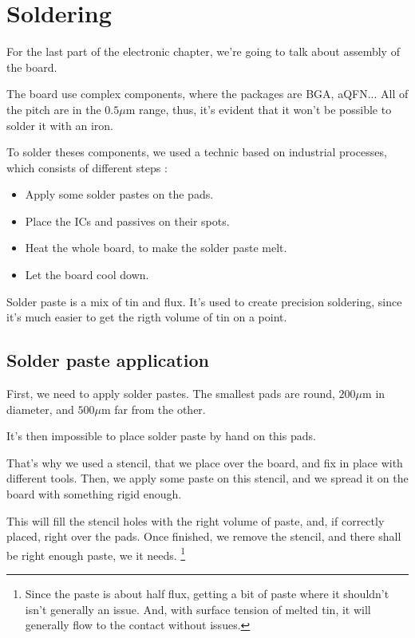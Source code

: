 \section{Soldering}
For the last part of the electronic chapter, we're going to talk about
assembly of the board.

The board use complex components, where the packages are BGA, aQFN...
All of the pitch are in the $0.5 \si{\mu\meter}$ range, thus, it's
evident that it won't be possible to solder it with an iron.

To solder theses components, we used a technic based on industrial
processes, which consists of different steps :

\begin{itemize}
    \item   Apply some solder pastes on the pads.
    \item   Place the ICs and passives on their spots.
    \item   Heat the whole board, to make the solder paste melt.
    \item   Let the board cool down.
\end{itemize}

Solder paste is a mix of tin and flux. It's used to create precision
soldering, since it's much easier to get the rigth volume of tin on a
point.

\subsection{Solder paste application}
First, we need to apply solder pastes. The smallest pads are round,
$200 \si{\mu\meter}$ in diameter, and $500 \si{\mu\meter}$ far from the
other.

It's then impossible to place solder paste by hand on this pads.

That's why we used a stencil, that we place over the board, and fix in
place with different tools. Then, we apply some paste on this stencil, and
we spread it on the board with something rigid enough.

This will fill the stencil holes with the right volume of paste, and, if
correctly placed, right over the pads. Once finished, we remove the stencil,
and there shall be right enough paste, we it needs. \footnote{
    Since the paste is about half flux, getting a bit of paste where it shouldn't
    isn't generally an issue. And, with surface tension of melted tin, it will
    generally flow to the contact without issues.
}

